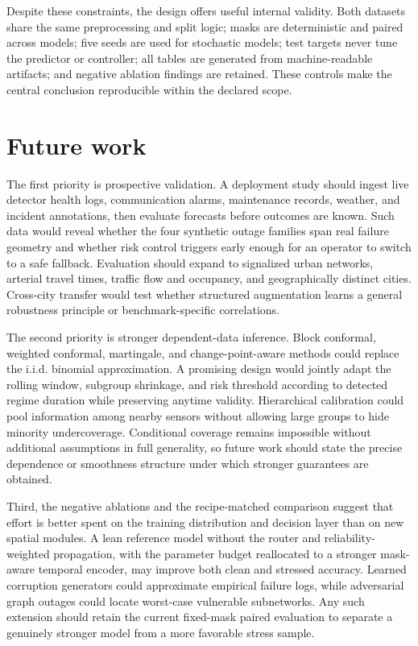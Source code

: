 \documentclass[preprint,12pt]{elsarticle}
\begin{document}
Despite these constraints, the design offers useful internal validity. Both
datasets share the same preprocessing and split logic; masks are deterministic
and paired across models; five seeds are used for stochastic models; test
targets never tune the predictor or controller; all tables are generated from
machine-readable artifacts; and negative ablation findings are retained. These
controls make the central conclusion reproducible within the declared scope.

\section{Future work}
The first priority is prospective validation. A deployment study should ingest
live detector health logs, communication alarms, maintenance records, weather,
and incident annotations, then evaluate forecasts before outcomes are known.
Such data would reveal whether the four synthetic outage families span real
failure geometry and whether risk control triggers early enough for an operator
to switch to a safe fallback. Evaluation should expand to signalized urban
networks, arterial travel times, traffic flow and occupancy, and geographically
distinct cities. Cross-city transfer would test whether structured augmentation
learns a general robustness principle or benchmark-specific correlations.

The second priority is stronger dependent-data inference. Block conformal,
weighted conformal, martingale, and change-point-aware methods could replace the
i.i.d. binomial approximation. A promising design would jointly adapt the
rolling window, subgroup shrinkage, and risk threshold according to detected
regime duration while preserving anytime validity. Hierarchical calibration
could pool information among nearby sensors without allowing large groups to
hide minority undercoverage. Conditional coverage remains impossible without
additional assumptions in full generality, so future work should state the
precise dependence or smoothness structure under which stronger guarantees are
obtained.

Third, the negative ablations and the recipe-matched comparison suggest that
effort is better spent on the training distribution and decision layer than on
new spatial modules. A lean reference model without the router and
reliability-weighted propagation, with the parameter budget reallocated to a
stronger mask-aware temporal encoder, may improve both clean and stressed
accuracy. Learned corruption generators could approximate empirical
failure logs, while adversarial graph outages could locate worst-case vulnerable
subnetworks. Any such extension should retain the current fixed-mask paired
evaluation to separate a genuinely stronger model from a more favorable stress
sample.
\end{document}
